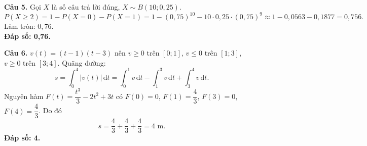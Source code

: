 \documentclass[12pt,a4paper]{article}
\begin{document}
\vspace{0.3cm}
\noindent\textbf{Câu 5.} Gọi $X$ là số câu trả lời đúng, $X \sim B(10; 0{,}25)$.
\[
P(X \ge 2) = 1 - P(X = 0) - P(X = 1) = 1 - (0{,}75)^{10} - 10\cdot 0{,}25\cdot (0{,}75)^9 \approx 1 - 0{,}0563 - 0{,}1877 = 0{,}756.
\]
Làm tròn: $0{,}76$.\\
\textbf{Đáp số: 0,76.}

\vspace{0.3cm}
\noindent\textbf{Câu 6.} $v(t) = (t - 1)(t - 3)$ nên $v \ge 0$ trên $[0; 1]$, $v \le 0$ trên $[1; 3]$, $v \ge 0$ trên $[3; 4]$. Quãng đường:
\[
s = \int_0^4 |v(t)|\,\mathrm{d}t = \int_0^1 v\,\mathrm{d}t - \int_1^3 v\,\mathrm{d}t + \int_3^4 v\,\mathrm{d}t.
\]
Nguyên hàm $F(t) = \dfrac{t^3}{3} - 2t^2 + 3t$ có $F(0) = 0$, $F(1) = \dfrac{4}{3}$, $F(3) = 0$, $F(4) = \dfrac{4}{3}$. Do đó
\[
s = \dfrac{4}{3} + \dfrac{4}{3} + \dfrac{4}{3} = 4\text{ m}.
\]
\textbf{Đáp số: 4.}
\end{document}
